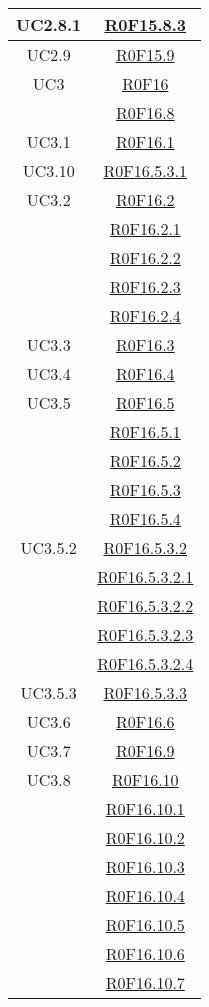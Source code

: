 \documentclass[../AnalisiDeiRequisiti.tex]{subfiles}
\begin{document}
\begin{longtable}{|c|c|}
	UC2.8.1 & \hyperlink{R0F15.8.3}{R0F15.8.3}\\\hline
	UC2.9 & \hyperlink{R0F15.9}{R0F15.9}\\\hline
	UC3 & \hyperlink{R0F16}{R0F16}\\& \hyperlink{R0F16.8}{R0F16.8}\\\hline
	UC3.1 & \hyperlink{R0F16.1}{R0F16.1}\\\hline
	UC3.10 & \hyperlink{R0F16.5.3.1}{R0F16.5.3.1}\\\hline
	UC3.2 & \hyperlink{R0F16.2}{R0F16.2}\\& \hyperlink{R0F16.2.1}{R0F16.2.1}\\& \hyperlink{R0F16.2.2}{R0F16.2.2}\\& \hyperlink{R0F16.2.3}{R0F16.2.3}\\& \hyperlink{R0F16.2.4}{R0F16.2.4}\\\hline
	UC3.3 & \hyperlink{R0F16.3}{R0F16.3}\\\hline
	UC3.4 & \hyperlink{R0F16.4}{R0F16.4}\\\hline
	UC3.5 & \hyperlink{R0F16.5}{R0F16.5}\\& \hyperlink{R0F16.5.1}{R0F16.5.1}\\& \hyperlink{R0F16.5.2}{R0F16.5.2}\\& \hyperlink{R0F16.5.3}{R0F16.5.3}\\& \hyperlink{R0F16.5.4}{R0F16.5.4}\\\hline
	UC3.5.2 & \hyperlink{R0F16.5.3.2}{R0F16.5.3.2}\\& \hyperlink{R0F16.5.3.2.1}{R0F16.5.3.2.1}\\& \hyperlink{R0F16.5.3.2.2}{R0F16.5.3.2.2}\\& \hyperlink{R0F16.5.3.2.3}{R0F16.5.3.2.3}\\& \hyperlink{R0F16.5.3.2.4}{R0F16.5.3.2.4}\\\hline
	UC3.5.3 & \hyperlink{R0F16.5.3.3}{R0F16.5.3.3}\\\hline
	UC3.6 & \hyperlink{R0F16.6}{R0F16.6}\\\hline
	UC3.7 & \hyperlink{R0F16.9}{R0F16.9}\\\hline
	UC3.8 & \hyperlink{R0F16.10}{R0F16.10}\\& \hyperlink{R0F16.10.1}{R0F16.10.1}\\& \hyperlink{R0F16.10.2}{R0F16.10.2}\\& \hyperlink{R0F16.10.3}{R0F16.10.3}\\& \hyperlink{R0F16.10.4}{R0F16.10.4}\\& \hyperlink{R0F16.10.5}{R0F16.10.5}\\& \hyperlink{R0F16.10.6}{R0F16.10.6}\\& \hyperlink{R0F16.10.7}{R0F16.10.7}\\\hline

\end{longtable}
\end{document}
